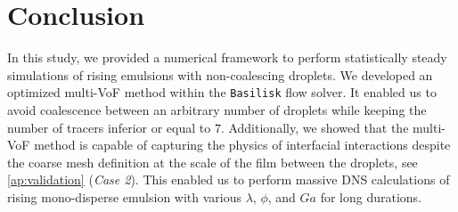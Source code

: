 \section{Conclusion}


In this study, we provided a numerical framework to perform statistically steady simulations of rising emulsions with non-coalescing droplets. 
We developed an optimized multi-VoF method within the \texttt{Basilisk} flow solver. 
It enabled us to avoid coalescence between an arbitrary number of droplets while keeping the number of tracers inferior or equal to $7$. 
Additionally, we showed that the multi-VoF method is capable of capturing the physics of interfacial interactions despite the coarse mesh definition at the scale of the film between the droplets, see \ref{ap:validation} (\textit{Case 2}). 
This enabled us to perform massive DNS calculations of rising mono-disperse emulsion with various $\lambda$, $\phi$, and $Ga$ for long durations.

